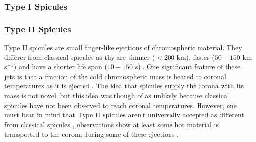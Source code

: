 \documentclass[12pt,a4paper,twoside]{article}
\begin{document}
\subsubsection{Type I Spicules}

\subsubsection{Type II Spicules}
Type II spicules are small finger-like ejections of chromospheric material. They differer from classical spicules as thy are thinner ($<200$ km), faster ($50-150$ km s$^{-1}$) and have a shorter life span ($10-150$ s) \citep{De_Pontieu2007}. One significant feature of these jets is that a fraction of the cold chromospheric mass is heated to coronal temperatures as it is ejected \citep{De_Pontieu2007}. The idea that spicules supply the corona with its mass is not novel\citep{Athay1982}, but this idea was though of as unlikely because classical spicules have not been observed to reach coronal temperatures. However, one must bear in mind that Type II spicules aren't universally accepted as different from classical spicules \citep{Zhang2012}, observations show at least some hot material is transported to the corona during some of these ejections \citep{Klimchuk2012}.        
\end{document}
